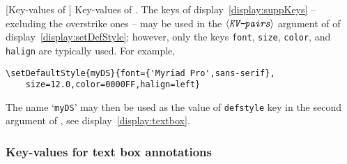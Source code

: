 \documentclass[12pt]{article}
\makeatletter
\let\opt\texttt
\def\ameta#1{$\langle\textit{\texttt{#1}}\rangle$}
\let\amtIndent\leftmargini
\edef\amtIndent{\the\parindent}
\renewcommand*{\theparagraph}{\texorpdfstring{\protect\P\protect\ }{\textparagraph}}
\renewcommand{\paragraph}
    {\renewcommand{\@seccntformat}[1]{\theparagraph}%
    \@startsection{paragraph}{4}{0pt}{6pt}{-3pt}{\color{\aeb@subsubsectioncolor}\bfseries}}
\makeatother
\begin{document}
\paragraph[Key-values of \texorpdfstring{\protect{}}{\textbackslash{setDefaultStyle}}]%
{Key-values of .}\label{para:KeysDS} The
keys of display~\eqref{display:suppKeys} -- excluding the overstrike ones --
may be used in the \ameta{KV-pairs} argument of  of
display~\eqref{display:setDefStyle}; however, only the keys \opt{font},
\opt{size}, \opt{color}, and \opt{halign} are typically used. For example,
\begin{Verbatim}[xleftmargin=\amtIndent,fontsize=\small,commandchars=!()]
\setDefaultStyle{myDS}{font={'Myriad Pro',sans-serif},
    size=12.0,color=0000FF,halign=left}
\end{Verbatim}
The name `\opt{myDS}' may then be used as the value of \opt{defstyle} key in the second argument
of , see display~\eqref{display:textbox}.

\subsubsection{Key-values for text box annotations}
\end{document}

